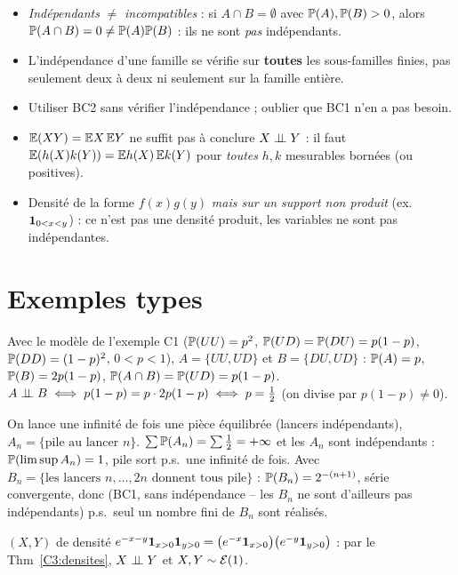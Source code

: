 \documentclass[11pt,a4paper]{article}
\begin{document}
\begin{piege}
\begin{itemize}
  \item \emph{Indépendants} $\neq$ \emph{incompatibles} : si $A\cap B=\emptyset$ avec $\mathbb{P}(A),\mathbb{P}(B)>0$, alors
  $\mathbb{P}(A\cap B)=0\neq\mathbb{P}(A)\mathbb{P}(B)$ : ils ne sont \emph{pas} indépendants.
  \item L'indépendance d'une famille se vérifie sur \textbf{toutes} les sous-familles finies, pas seulement deux à deux
  ni seulement sur la famille entière.
  \item Utiliser BC2 sans vérifier l'indépendance ; oublier que BC1 n'en a pas besoin.
  \item $\mathbb{E}(XY)=\mathbb{E} X\,\mathbb{E} Y$ ne suffit pas à conclure $X\perp\!\!\!\perp Y$ : il faut $\mathbb{E}(h(X)k(Y))=\mathbb{E} h(X)\,\mathbb{E} k(Y)$ pour \emph{toutes} $h,k$ mesurables bornées (ou positives).
  \item Densité de la forme $f(x)g(y)$ \emph{mais sur un support non produit} (ex.\ $\mathbf{1}_{0<x<y}$) : ce n'est pas une
  densité produit, les variables ne sont pas indépendantes.
\end{itemize}
\end{piege}

\section*{Exemples types}

\begin{exemple}\label{C3:ex-arbre}
Avec le modèle de l'exemple C1 ($\mathbb{P}(UU)=p^2$, $\mathbb{P}(UD)=\mathbb{P}(DU)=p(1-p)$, $\mathbb{P}(DD)=(1-p)^2$, $0<p<1$),
$A=\{UU,UD\}$ et $B=\{DU,UD\}$ : $\mathbb{P}(A)=p$, $\mathbb{P}(B)=2p(1-p)$, $\mathbb{P}(A\cap B)=\mathbb{P}(UD)=p(1-p)$.
$A\perp\!\!\!\perp B\iff p(1-p)=p\cdot2p(1-p)\iff p=\frac12$ (on divise par $p(1-p)\neq0$).
\end{exemple}

\begin{exemple}
On lance une infinité de fois une pièce équilibrée (lancers indépendants), $A_n=\{\text{pile au lancer }n\}$.
$\sum\mathbb{P}(A_n)=\sum\frac12=+\infty$ et les $A_n$ sont indépendants : $\mathbb{P}(\limsup A_n)=1$, pile sort p.s.\ une infinité de fois.
Avec $B_n=\{\text{les lancers }n,\dots,2n\text{ donnent tous pile}\}$ : $\mathbb{P}(B_n)=2^{-(n+1)}$, série convergente, donc (BC1, sans
indépendance -- les $B_n$ ne sont d'ailleurs pas indépendants) p.s.\ seul un nombre fini de $B_n$ sont réalisés.
\end{exemple}

\begin{exemple}
$(X,Y)$ de densité $e^{-x-y}\mathbf{1}_{x>0}\mathbf{1}_{y>0}=\bigl(e^{-x}\mathbf{1}_{x>0}\bigr)\bigl(e^{-y}\mathbf{1}_{y>0}\bigr)$ : par le Thm~\ref{C3:densites},
$X\perp\!\!\!\perp Y$ et $X,Y\sim\mathcal{E}(1)$.
\end{exemple}
\end{document}
